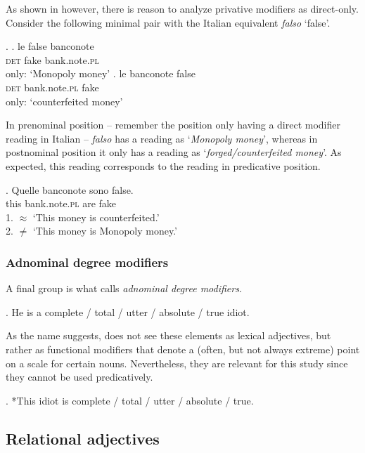 \documentclass [output=book,colorlinks,citecolor=brown]{langscibook}
\begin{document}
As shown in \citet[21–23]{cinque:2014:semantics} however, there is reason to analyze privative modifiers as direct-only. Consider the following minimal pair with the Italian equivalent \textit{falso} `false’.

\ex. \ag. le false banconote\\
\textsc{det} fake bank.note.\textsc{pl}\\
only: `Monopoly money’
 \bg. le banconote false \\
\textsc{det} bank.note.\textsc{pl} fake\\
only: `counterfeited money’ \hfill \citep[21]{cinque:2014:semantics}

In prenominal position -- remember the position only having a direct modifier reading in Italian -- \textit{falso} has a reading as `\textit{Monopoly money}’, whereas in postnominal position it only has a reading as `\textit{forged/counterfeited money}’. As expected, this reading corresponds to the reading in predicative position.

\exg. Quelle banconote sono false.\\
this bank.note.\textsc{pl} are fake\\
1. $\approx$ `This money is counterfeited.’\\
2. $\neq$ `This money is Monopoly money.’ \null\hfill \citep[21]{cinque:2014:semantics}

\subsubsection{Adnominal degree modifiers}

A final group is what \citet{morzycki:2016:mod} calls \textit{adnominal degree modifiers}. %

\ex. He is a complete / total / utter / absolute / true idiot. \\ \null\hfill \citep[56–57]{morzycki:2016:mod}

As the name suggests, \citet{morzycki:2014:where, morzycki:2016:mod} does not see these elements as lexical adjectives, but rather as functional modifiers that denote a (often, but not always extreme) point on a scale for certain nouns. Nevertheless, they are relevant for this study since they cannot be used predicatively.

\ex. *This idiot is complete / total / utter / absolute / true.

\subsection{Relational adjectives} \label{RA}
\end{document}
